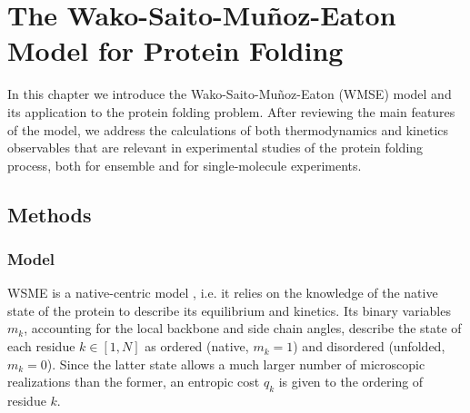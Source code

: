 \chapter{The Wako-Saito-Mu{\~n}oz-Eaton Model for Protein Folding
}
\label{chap:wsme-model}
\nopagebreak

In this chapter we introduce the Wako-Saito-Mu{\~n}oz-Eaton (WMSE) model and its application to the protein folding 
problem.
After reviewing the main features of the model, we address the calculations of
both thermodynamics and kinetics observables that are relevant in experimental
studies of the protein folding process, both for ensemble and for
single-molecule experiments.

\section{Methods}
\label{sec:methods}
\subsection{Model}

WSME is a native-centric model \cite{Ueda1978}, i.e. it relies on the knowledge of
the native state of the protein to describe its equilibrium and kinetics.
Its binary variables $m_k$, accounting for the local backbone and side chain
angles, describe the state of each residue  $k \in [1, N]$
 as ordered (native,  $m_k=1$) and disordered
(unfolded, $m_k=0$). Since the latter state allows a much larger number of
microscopic realizations than the former, an entropic cost  $q_k$ is
given to the ordering of residue $k$.

